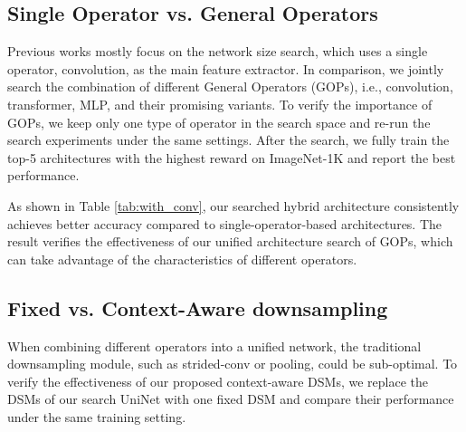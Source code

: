 \documentclass[runningheads]{llncs}
\begin{document}
\subsection{Single Operator vs. General Operators}
\begin{table}[t]
    \caption{Performance on ImageNet with different search settings. One type of operator is kept for comparison with the hybrid UniNet.}
    \centering
\label{tab:with_conv}
\end{table}

Previous works \cite{mnas,efficientnet} mostly focus on the network size search, which uses a single operator, convolution, as the main feature extractor. In comparison, we jointly search the combination of different General Operators (GOPs), i.e., convolution, transformer, MLP, and their promising variants. To verify the importance of GOPs, we keep only one type of operator in the search space and re-run the search experiments under the same settings. After the search, we fully train the top-5 architectures with the highest reward on ImageNet-1K and report the best performance. 

As shown in Table \ref{tab:with_conv}, our searched hybrid architecture consistently achieves better accuracy compared to single-operator-based architectures. The result verifies the effectiveness of our unified architecture search of GOPs, which can take advantage of the characteristics of different operators. 



\subsection{Fixed vs. Context-Aware downsampling}

When combining different operators into a unified network, the traditional downsampling module, such as strided-conv or pooling, could be sub-optimal. To verify the effectiveness of our proposed context-aware DSMs, we replace the DSMs of our search UniNet with one fixed DSM and compare their performance under the same training setting.
\end{document}
